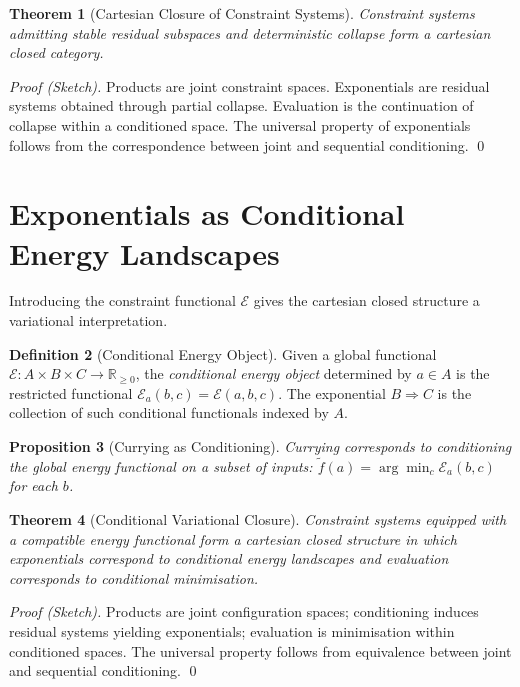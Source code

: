 \documentclass[12pt, oneside]{amsbook}
\theoremstyle{plain}
\newtheorem{theorem}{Theorem}[section]
\newtheorem{proposition}[theorem]{Proposition}
\theoremstyle{definition}
\newtheorem{definition}[theorem]{Definition}
\theoremstyle{remark}
\begin{document}
\begin{theorem}[Cartesian Closure of Constraint Systems]
\label{thm:ccc}
Constraint systems admitting stable residual subspaces and deterministic
collapse form a cartesian closed category.
\end{theorem}

\begin{proof}[Proof (Sketch)]
Products are joint constraint spaces. Exponentials are residual systems
obtained through partial collapse. Evaluation is the continuation of collapse
within a conditioned space. The universal property of exponentials follows from
the correspondence between joint and sequential conditioning. \qed
\end{proof}

\section{Exponentials as Conditional Energy Landscapes}
\label{sec:var:exponentials}

Introducing the constraint functional $\mathcal{E}$ gives the cartesian closed
structure a variational interpretation.

\begin{definition}[Conditional Energy Object]
\label{def:conditional-energy}
Given a global functional $\mathcal{E} : A \times B \times C \to
\mathbb{R}_{\geq 0}$, the \emph{conditional energy object} determined by
$a \in A$ is the restricted functional $\mathcal{E}_a(b,c) = \mathcal{E}(a,b,c)$.
The exponential $B \Rightarrow C$ is the collection of such conditional
functionals indexed by $A$.
\end{definition}

\begin{proposition}[Currying as Conditioning]
\label{prop:currying-conditioning}
Currying corresponds to conditioning the global energy functional on a subset
of inputs: $\tilde{f}(a) = \arg\min_c \mathcal{E}_a(b,c)$ for each $b$.
\end{proposition}

\begin{theorem}[Conditional Variational Closure]
\label{thm:conditional-closure}
Constraint systems equipped with a compatible energy functional form a
cartesian closed structure in which exponentials correspond to conditional
energy landscapes and evaluation corresponds to conditional minimisation.
\end{theorem}

\begin{proof}[Proof (Sketch)]
Products are joint configuration spaces; conditioning induces residual systems
yielding exponentials; evaluation is minimisation within conditioned spaces.
The universal property follows from equivalence between joint and sequential
conditioning. \qed
\end{proof}
\end{document}
